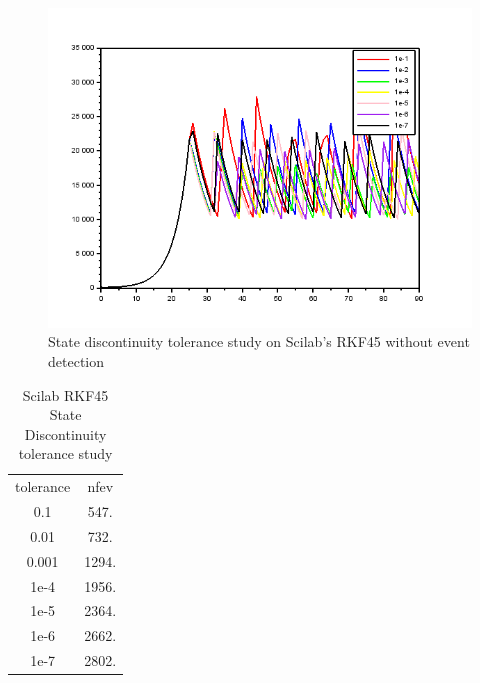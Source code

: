 \begin{figure}[h]
	\centering
	\includegraphics[width=0.7\linewidth]{./figures/tolerance_state_rk45_no_event_sci}
	\caption{State discontinuity tolerance study on Scilab's RKF45 without event detection}
	\label{fig:tolerance_state_rk45_no_event_sci}
\end{figure}

\begin{table}[h]
\caption {Scilab RKF45 State Discontinuity tolerance study} \label{tab:tolerance_state_discontinuity_rk45_scilab} 
\begin{center}
\begin{tabular}{ c c }
tolerance & nfev \\ 
   0.1    & 547. \\
   0.01   & 732. \\
   0.001  & 1294. \\
   1e-4   & 1956. \\
   1e-5   & 2364. \\
   1e-6   & 2662. \\
   1e-7   & 2802. \\
\end{tabular}
\end{center}
\end{table}
